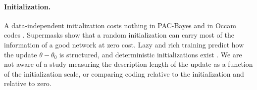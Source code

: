 \paragraph{Initialization.} A data-independent initialization costs nothing in PAC-Bayes \cite{dziugaite2017computing} and in Occam codes \cite{arora2018stronger,lotfi2022pac}. Supermasks \cite{zhou2019deconstructing} show that a random initialization can carry most of the information of a good network at zero cost. Lazy and rich training \cite{chizat2019lazy,jacot2018ntk,mei2018mean} predict how the update $\theta-\theta_0$ is structured, and deterministic initializations exist \cite{zhao2022zero}. We are not aware of a study measuring the description length of the update as a function of the initialization scale, or comparing coding relative to the initialization and relative to zero.
